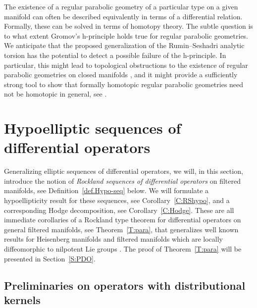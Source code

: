 \documentclass[reqno,12pt]{amsart}
\theoremstyle{plain}
\theoremstyle{definition}
\begin{document}
The existence of a regular parabolic geometry of a particular type on a given manifold can often be described equivalently in terms of a differential relation.
Formally, these can be solved in terms of homotopy theory.
The subtle question is to what extent Gromov's h-principle \cite{G86} holds true for regular parabolic geometries.
We anticipate that the proposed generalization of the Rumin--Seshadri analytic torsion has the potential to detect a possible failure of the h-principle.
In particular, this might lead to topological obstructions to the existence of regular parabolic geometries on closed manifolds \cite{DH16}, and it might provide a sufficiently strong tool to show that formally homotopic regular parabolic geometries need not be homotopic in general, see \cite{P16}.










\section{Hypoelliptic sequences of differential operators}\label{S:hesequences}










Generalizing elliptic sequences of differential operators, we will, in this section, introduce the notion of \emph{Rockland sequences of differential operators} on filtered manifolds, see Definition~\ref{def.Hypo-seq} below.
We will formulate a hypoellipticity result for these sequences, see Corollary~\ref{C:RShypo}, and a corresponding Hodge decomposition, see Corollary~\ref{C:Hodge}.
These are all immediate corollaries of a Rockland type theorem for differential operators on general filtered manifolds, see Theorem~\ref{T:para}, that generalizes well known results for Heisenberg manifolds \cite{BG88,P08,T84} and filtered manifolds which are locally diffeomorphic to nilpotent Lie groups \cite{CGGP92}.
The proof of Theorem~\ref{T:para} will be presented in Section~\ref{S:PDO}.



\subsection{Preliminaries on operators with distributional kernels}\label{SS:prelim}
\end{document}
